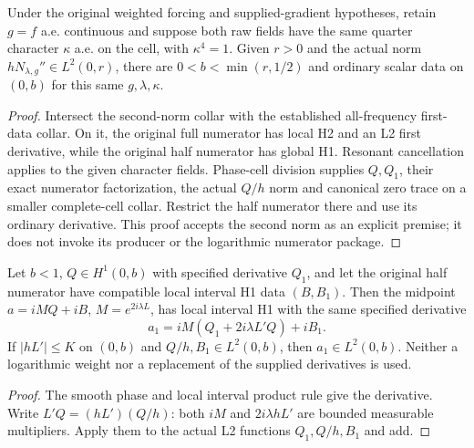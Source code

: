 \begin{lemma}
\label{lem:quarter-h1-scalar-data}
\leanok
Under the original weighted forcing and supplied-gradient hypotheses, retain
$g=f$ a.e. continuous and suppose both raw fields have the same quarter
character $\kappa$ a.e. on the cell, with $\kappa^4=1$.
Given $r>0$ and the actual norm $hN_{\lambda,g}''\in L^2(0,r)$,
there are $0<b<\min(r,1/2)$ and ordinary scalar data on $(0,b)$
for this same $g,\lambda,\kappa$.
\end{lemma}

\begin{proof}
\leanok
Intersect the second-norm collar with the established all-frequency first-data
collar. On it, the original full numerator has local H2 and an L2 first
derivative, while the original half numerator has global H1.
Resonant cancellation applies to the given character fields.
Phase-cell division supplies $Q,Q_1$, their exact numerator factorization,
the actual $Q/h$ norm and canonical zero trace on a smaller complete-cell collar.
Restrict the half numerator there and use its ordinary derivative.
This proof accepts the second norm as an explicit premise; it does not invoke
its producer or the logarithmic numerator package.
\end{proof}

\begin{lemma}
\label{lem:ordinary-midpoint-gain}
\leanok
Let $b<1$, $Q\in H^1(0,b)$ with specified derivative $Q_1$, and let the
original half numerator have compatible local interval H1 data $(B,B_1)$.
Then the midpoint $a=iMQ+iB$, $M=e^{2i\lambda L}$, has local interval H1
with the same specified derivative
\[
 a_1=iM(Q_1+2i\lambda L'Q)+iB_1 .
\]
If $|hL'|\le K$ on $(0,b)$ and $Q/h,B_1\in L^2(0,b)$, then
$a_1\in L^2(0,b)$. Neither a logarithmic weight nor a replacement of the
supplied derivatives is used.
\end{lemma}

\begin{proof}
\leanok
The smooth phase and local interval product rule give the derivative.
Write $L'Q=(hL')(Q/h)$: both $iM$ and $2i\lambda hL'$ are bounded measurable
multipliers. Apply them to the actual L2 functions $Q_1,Q/h,B_1$ and add.
\end{proof}

